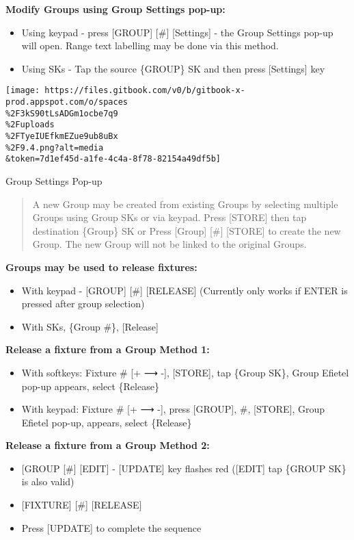 \documentclass[
]{article}
\begin{document}
\textbf{Modify Groups using Group Settings pop-up:}

\begin{itemize}
\item
  Using keypad - press {[}GROUP{]} {[}\#{]} {[}Settings{]} - the Group Settings pop-up will open. Range text labelling may be done via this method.
\item
  Using SKs - Tap the source \{GROUP\} SK and then press {[}Settings{]} key
\end{itemize}

\texttt{[image: https://files.gitbook.com/v0/b/gitbook-x-prod.appspot.com/o/spaces\\\%2F3kS90tLsADGm1ocbe7q9\\\%2Fuploads\\\%2FTyeIUEfkmEZue9ub8uBx\\\%2F9.4.png?alt=media\\\&token=7d1ef45d-a1fe-4c4a-8f78-82154a49df5b]}

Group Settings Pop-up

\begin{quote}
A new Group may be created from existing Groups by selecting multiple Groups using Group SKs or via keypad. Press {[}STORE{]} then tap destination \{Group\} SK or Press {[}Group{]} {[}\#{]} {[}STORE{]} to create the new Group. The new Group will not be linked to the original Groups.
\end{quote}

\textbf{Groups may be used to release fixtures:}

\begin{itemize}
\item
  With keypad - {[}GROUP{]} {[}\#{]} {[}RELEASE{]} (Currently only works if ENTER is pressed after group selection)
\item
  With SKs, \{Group \#\}, {[}Release{]}
\end{itemize}

\textbf{Release a fixture from a Group Method 1:}

\begin{itemize}
\item
  With softkeys: Fixture \# {[}+ ⟶ -{]}, {[}STORE{]}, tap \{Group SK\}, Group Efietel pop-up appears, select \{Release\}
\item
  With keypad: Fixture \# {[}+ ⟶ -{]}, press {[}GROUP{]}, \#, {[}STORE{]}, Group Efietel pop-up, appears, select \{Release\}
\end{itemize}

\textbf{Release a fixture from a Group Method 2:}

\begin{itemize}
\item
  {[}GROUP {[}\#{]} {[}EDIT{]} - {[}UPDATE{]} key flashes red ({[}EDIT{]} tap \{GROUP SK\} is also valid)
\item
  {[}FIXTURE{]} {[}\#{]} {[}RELEASE{]}
\item
  Press {[}UPDATE{]} to complete the sequence
\end{itemize}
\end{document}
